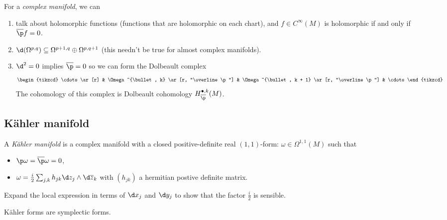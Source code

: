 \documentclass[a4paper]{article}
\newcommand{\w}{\wedge} %
\begin{document}
\begin{remark}
\begin{enumerate}
    For a \emph{complex manifold}, we can
    \begin{enumerate}
    \item talk about holomorphic functions (functions that are holomorphic on each chart), and \(f \in C^\infty(M)\) is holomorphic if and only if \(\overline \p f = 0\).
    \item \(\d(\Omega^{p, q}) \subseteq \Omega^{p + 1, q} \oplus \Omega^{p, q + 1}\) (this needn't be true for almost complex manifolds).
    \item \(\d^2 = 0\) implies \(\overline \p = 0\) so we can form the Dolbeault complex
      \[
        \begin{tikzcd}
          \cdots \ar[r] & \Omega^{\bullet, k} \ar[r, "\overline \p"] & \Omega^{\bullet, k + 1} \ar[r, "\overline \p"] & \cdots
        \end{tikzcd}
      \]
      The cohomology of this complex is Dolbeault cohomology \(H_{\overline \p}^{\bullet, k}(M)\).
    \end{enumerate}
  \end{enumerate}
\end{remark}

\subsection{Kähler manifold}

\begin{definition}
  A \emph{Kähler manifold} is a complex manifold with a closed positive-definite real \((1, 1)\)-form: \(\omega \in \Omega^{1, 1}(M)\) such that
  \begin{itemize}
  \item \(\p \omega = \overline \p \omega = 0\),
  \item \(\omega = \frac{i}{2} \sum_{j, k} h_{jk} \d z_j \w \d \overline z_k\) with \((h_{jk})\) a hermitian postive definite matrix.
  \end{itemize}
\end{definition}

\begin{ex}
  Expand the local expression in terms of \(\d x_j\) and \(\d y_j\) to show that the factor \(\frac{i}{2}\) is sensible.
\end{ex}

\begin{proposition}
  Kähler forms are symplectic forms.
\end{proposition}
\end{document}
